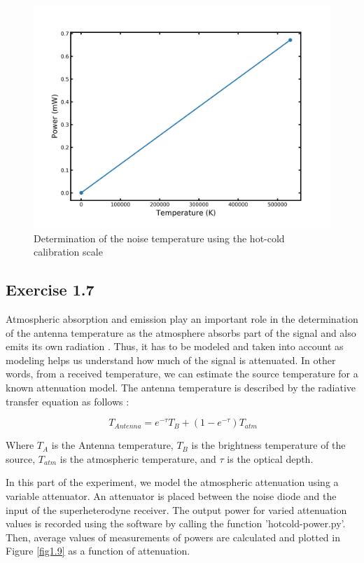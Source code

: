 \documentclass[12pt]{article}
\begin{document}
\begin{figure}[H]
    \centering
    \includegraphics[scale=.5]{fig/Exercise_6_2.jpg}
    \caption{Determination of the noise temperature using the hot-cold calibration scale}
    \label{fig1.62}
\end{figure}

\subsection{Exercise 1.7}

Atmospheric absorption and emission play an important role in the determination of the antenna temperature as the atmosphere absorbs part of the signal and also emits its own radiation \cite{klein}. Thus, it has to be modeled and taken into account as modeling helps us understand how much of the signal is attenuated. In other words, from a received temperature, we can estimate the source temperature for a known attenuation model. The antenna temperature is described by the radiative transfer equation as follows \cite{klein}: 

\begin{equation}
\ T_{Antenna} = e^{-\tau} T_{B} + (1-e^{-\tau}) T_{atm}
\end{equation}

Where $T_{A}$ is the Antenna temperature, $T_{B}$ is the brightness temperature of the source, $T_{atm}$  is the atmospheric temperature, and $\tau$ is the optical depth. 


In this part of the experiment, we model the atmospheric attenuation using a variable attenuator. An attenuator is placed between the noise diode and the input of the superheterodyne receiver. The output power for varied attenuation values is recorded using the software by calling the function 'hotcold-power.py'. Then, average values of measurements of powers are calculated and plotted in Figure \ref{fig1.9} as a function of attenuation. 
\end{document}
